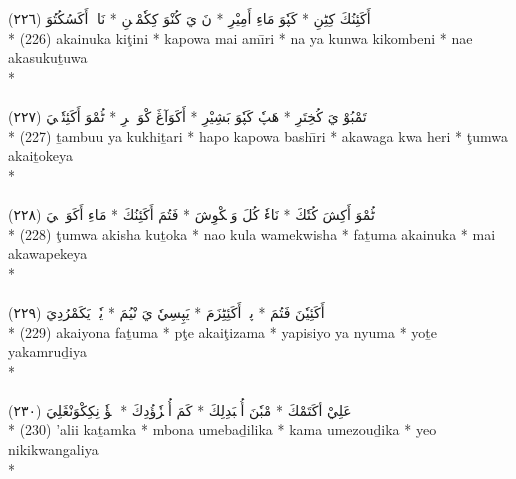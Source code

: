 \documentclass[a4paper, 12pt]{report}
\begin{document}
\begin{center}
\textarabic{(٢٢٦) \textcolor{mygreen}{أَكَئِنُكَ كِٹِنِ  * كَپٗوَ مَاءِ أَمِيْرِ  * نَ يَ كُنْوَ كِكٗمْبٖنِ  * نَاءٖ أَكَسُكُتُوَ }} \\* 
(226) akainuka kiţini  * kapowa mai amı̄ri  * na ya kunwa kikombeni  * nae akasukuṯuwa  \\* 
 \\ 
\\[8mm] 

\textarabic{(٢٢٧) \textcolor{mygreen}{تَمْبُوْ يَ كُخِتَرِ  * هَپٗ كَپٗوَ بَشِيْرِ  * أَكَوَآڠَ كْوَ هٖرِ  * ٹُمْوَ أَكَئِتٗكٖيَ }} \\* 
(227) ṯambuu ya kukhiṯari  * hapo kapowa bashı̄ri  * akawaga kwa heri  * ţumwa akaiṯokeya  \\* 
 \\ 
\\[8mm] 

\textarabic{(٢٢٨) \textcolor{mygreen}{ٹُمْوَ أَكِشَ كُتٗكَ  * نَاءٗ كُلَ وَمٖكْوِشَ  * فَتُمَ أَكَئِنُكَ  * مَاءِ أَكَوَپٖكٖيَ }} \\* 
(228) ţumwa akisha kuṯoka  * nao kula wamekwisha  * faṯuma akainuka  * mai akawapekeya  \\* 
 \\ 
\\[8mm] 

\textarabic{(٢٢٩) \textcolor{mygreen}{أَكَئِيٗنَ فَتُمَ  * پٹٖ أَكَئِٹِزَمَ  * يَپِسِيٗ يَ نْيُمَ  * يٗتٖ يَكَمْرُدِيَ }} \\* 
(229) akaiyona faṯuma  * pţe akaiţizama  * yapisiyo ya nyuma  * yoṯe yakamruḏiya  \\* 
 \\ 
\\[8mm] 

\textarabic{(٢٣٠) \textcolor{mygreen}{عَلِيْ أكَتَمْكَ  * مْبٗنَ أُمٖبَدِلِكَ  * كَمَ أُمٖزٗؤُدِكَ  * يٖؤٗ نِكِكْوَنْڠَلِيَ }} \\* 
(230) 'alii kaṯamka  * mbona umebaḏilika  * kama umezouḏika  * yeo nikikwangaliya  \\* 
 \\ 
\\[8mm] 


\end{center}
\end{document}
